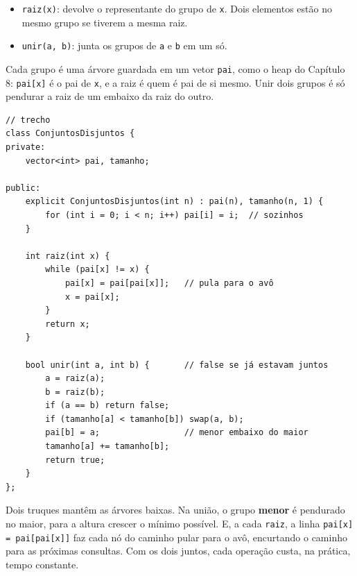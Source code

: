 \begin{itemize}
  \item \texttt{raiz(x)}: devolve o representante do grupo de \texttt{x}. Dois elementos estão no mesmo grupo se tiverem a mesma raiz.
  \item \texttt{unir(a, b)}: junta os grupos de \texttt{a} e \texttt{b} em um só.
\end{itemize}

Cada grupo é uma árvore guardada em um vetor \texttt{pai}, como o heap do Capítulo 8: \texttt{pai[x]} é o pai de \texttt{x}, e a raiz é quem é pai de si mesmo. Unir dois grupos é só pendurar a raiz de um embaixo da raiz do outro.

\begin{codigo}
\begin{Verbatim}[breaklines=true, breaksymbolleft={}, fontsize=\footnotesize]
// trecho
class ConjuntosDisjuntos {
private:
    vector<int> pai, tamanho;

public:
    explicit ConjuntosDisjuntos(int n) : pai(n), tamanho(n, 1) {
        for (int i = 0; i < n; i++) pai[i] = i;  // sozinhos
    }

    int raiz(int x) {
        while (pai[x] != x) {
            pai[x] = pai[pai[x]];   // pula para o avô
            x = pai[x];
        }
        return x;
    }

    bool unir(int a, int b) {       // false se já estavam juntos
        a = raiz(a);
        b = raiz(b);
        if (a == b) return false;
        if (tamanho[a] < tamanho[b]) swap(a, b);
        pai[b] = a;                 // menor embaixo do maior
        tamanho[a] += tamanho[b];
        return true;
    }
};
\end{Verbatim}
\end{codigo}

Dois truques mantêm as árvores baixas. Na união, o grupo \textbf{menor} é pendurado no maior, para a altura crescer o mínimo possível. E, a cada \texttt{raiz}, a linha \texttt{pai[x] = pai[pai[x]]} faz cada nó do caminho pular para o avô, encurtando o caminho para as próximas consultas. Com os dois juntos, cada operação custa, na prática, tempo constante.

